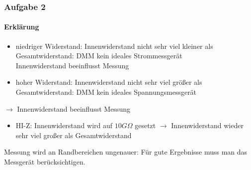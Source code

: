 \begin{frame}
\frametitle{Aufgabe 2}
\framesubtitle{Erklärung}
    \begin{itemize}
        \item niedriger Widerstand: Innenwiderstand nicht sehr viel kleiner als
        Gesamtwiderstand: DMM kein  ideales Strommessgerät \\
        Innenwiderstand beeinflusst Messung
        \item hoher Widerstand:  Innenwiderstand nicht sehr viel größer als
        Gesamtwiderstand:  DMM kein  ideales Spannungsmessgerät \\
     \end{itemize}
     $\rightarrow$ Innenwiderstand beeinflusst Messung
     \begin{itemize}
        \item HI-Z: Innenwiderstand wird auf $10G\Omega$ gesetzt $\rightarrow$
        Innenwiderstand wieder sehr viel großer als Gesamtwiderstand
    \end{itemize}
    Messung wird an Randbereichen ungenauer: Für gute Ergebnisse muss man das
    Messgerät berücksichtigen.
\end{frame}


